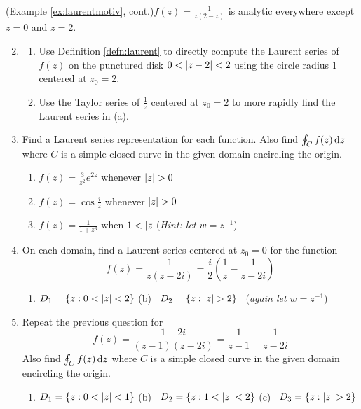 \goodbreak

\begin{exercises}
	\exstart (Example \ref{ex:laurentmotiv}, cont.)\lstsp $f(z)=\frac 1{z(2-z)}$ is analytic everywhere except $z=0$ and $z=2$.\vspace{-5pt}

	\begin{enumerate}\setcounter{enumi}{1}
	  \item[]\begin{enumerate}
	    \item Use Definition \ref{defn:laurent} to directly compute the Laurent series of $f(z)$ on the punctured disk $0<\left| z-2\right|<2$ using the circle radius 1 centered at $z_0=2$.
	    \item Use the Taylor series of $\frac 1z$ centered at $z_0=2$ to more rapidly find the Laurent series in (a).
	  \end{enumerate}
	  
	  
	  \item Find a Laurent series representation for each function. Also find $\oint_Cf(z)\,{\mathrm{d} z}$ where $C$ is a simple closed curve in the given domain encircling the origin.
	  \begin{enumerate}
	    \item $f(z)=\frac 3{z^2}e^{2z}$ whenever $\nm z>0$
	   
	    \item $f(z)=\cos\frac iz$ whenever $\nm z>0$
	    
	    \item $f(z)=\frac 1{1+z^3}$ when $1<\left| z\right|$\quad (\emph{Hint: let $w=z^{-1}$})
	  \end{enumerate}
	  
	  \goodbreak
	  
	  \item On each domain, find a Laurent series centered at $z_0=0$ for the function
	  \[
	  	f(z)=\frac{1}{z(z-2i)}=\frac i2\left(\frac 1z-\frac 1{z-2i}\right)
	  \]
	  \begin{enumerate}
	    \item $D_1=\{z:0<\left| z\right|<2\}$
	    \qquad\qquad
	    (b) \ $D_2=\{z:\nm z>2\}$ \ (\emph{again let $w=z^{-1}$})
		\end{enumerate}
		
		
		\item Repeat the previous question for
	  \[
	  	f(z)=\frac{1-2i}{(z-1)(z-2i)}=\frac 1{z-1}-\frac 1{z-2i}
	  \]
	  Also find $\oint_Cf(z)\,{\mathrm{d} z}$ where $C$ is a simple closed curve in the given domain encircling the origin.
	  \begin{enumerate}
	    \item $D_1=\{z:0<\left| z\right|<1\}$
	    \qquad\quad%
	    (b) \ $D_2=\{z:1<\left| z\right|<2\}$
			\qquad\quad
			(c) \ $D_3=\{z:\nm z>2\}$
		\end{enumerate}
	

\end{enumerate}
\end{exercises}
